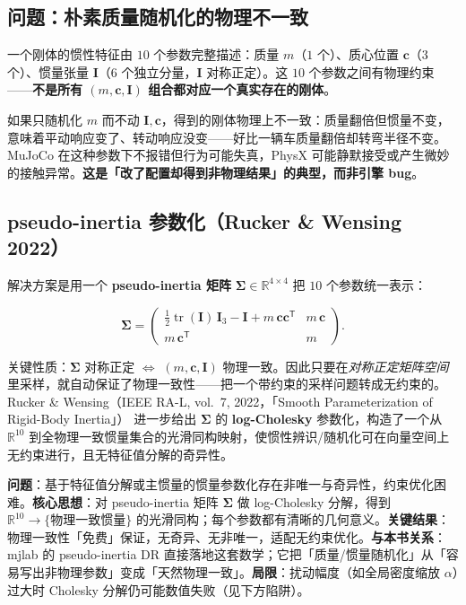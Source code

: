 \subsection{问题：朴素质量随机化的物理不一致}
\label{sec:rlmc-dr-inertia-problem}

一个刚体的惯性特征由 $10$ 个参数完整描述：质量 $m$（$1$ 个）、质心位置 $\mathbf c$（$3$ 个）、惯量张量 $\mathbf I$（$6$ 个独立分量，$\mathbf I$ 对称正定）。这 $10$ 个参数之间有物理约束——\textbf{不是所有 $(m,\mathbf c,\mathbf I)$ 组合都对应一个真实存在的刚体}。

如果只随机化 $m$ 而不动 $\mathbf I,\mathbf c$，得到的刚体物理上不一致：质量翻倍但惯量不变，意味着平动响应变了、转动响应没变——好比一辆车质量翻倍却转弯半径不变。MuJoCo 在这种参数下不报错但行为可能失真，PhysX 可能静默接受或产生微妙的接触异常。\textbf{这是「改了配置却得到非物理结果」的典型，而非引擎 bug}。

\subsection{pseudo-inertia 参数化（Rucker \& Wensing 2022）}
\label{sec:rlmc-dr-inertia-pseudo}

解决方案是用一个 \textbf{pseudo-inertia 矩阵} $\boldsymbol\Sigma\in\mathbb{R}^{4\times 4}$ 把 $10$ 个参数统一表示：

\begin{equation}
\boldsymbol\Sigma=
\begin{pmatrix}
\tfrac{1}{2}\operatorname{tr}(\mathbf I)\,\mathbf I_3-\mathbf I+m\,\mathbf c\mathbf c^{\mathsf T} & m\,\mathbf c \\[2pt]
m\,\mathbf c^{\mathsf T} & m
\end{pmatrix}.
\label{eq:rlmc-dr-pseudoinertia}
\end{equation}

关键性质：$\boldsymbol\Sigma$ 对称正定 $\Longleftrightarrow$ $(m,\mathbf c,\mathbf I)$ 物理一致。因此只要在\emph{对称正定矩阵空间}里采样，就自动保证了物理一致性——把一个带约束的采样问题转成无约束的。Rucker \& Wensing（IEEE RA-L, vol.~7, 2022，「Smooth Parameterization of Rigid-Body Inertia」）\cite{rucker2022pseudoinertia} 进一步给出 $\boldsymbol\Sigma$ 的 \textbf{log-Cholesky} 参数化，构造了一个从 $\mathbb{R}^{10}$ 到全物理一致惯量集合的光滑同构映射，使惯性辨识/随机化可在向量空间上无约束进行，且无特征值分解的奇异性。

\begin{paper}\label{paper:rlmc-dr-pseudo}
\textbf{问题}：基于特征值分解或主惯量的惯量参数化存在非唯一与奇异性，约束优化困难。\textbf{核心思想}：对 pseudo-inertia 矩阵 $\boldsymbol\Sigma$ 做 log-Cholesky 分解，得到 $\mathbb{R}^{10}\to\{\text{物理一致惯量}\}$ 的光滑同构；每个参数都有清晰的几何意义。\textbf{关键结果}：物理一致性「免费」保证，无奇异、无非唯一，适配无约束优化。\textbf{与本书关系}：mjlab 的 pseudo-inertia DR 直接落地这套数学；它把「质量/惯量随机化」从「容易写出非物理参数」变成「天然物理一致」。\textbf{局限}：扰动幅度（如全局密度缩放 $\alpha$）过大时 Cholesky 分解仍可能数值失败（见下方陷阱）。
\end{paper}

